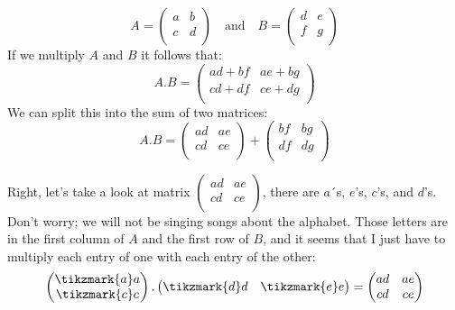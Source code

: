 \documentclass[600paper, 11pt,twoside,openany]{kdp}
\begin{document}
\[A = 
\begin{pmatrix}
a & b \\
c & d\\
\end{pmatrix} \quad \textrm{and} \quad  B = 
\begin{pmatrix}
d & e \\
f & g\\
\end{pmatrix}
\]
\indent If we multiply $A$ and $B$ it follows that:
\[A.B = 
\begin{pmatrix}
ad + bf & ae + bg \\
cd + df & ce + dg \\
\end{pmatrix}
\]
\indent We can split this into the sum of two matrices:
\begin{equation} \label{eq:mm}
A.B = 
\begin{pmatrix}
ad  & ae  \\
cd  & ce  \\
\end{pmatrix}
+
\begin{pmatrix}
bf &  bg \\
df &  dg \\
\end{pmatrix}
\end{equation}

\indent Right, let's take a look at matrix $\begin{pmatrix}
ad  & ae  \\
cd  & ce  \\
\end{pmatrix}$, there are $a$´s, $e$'s, $c$'s, and $d$'s. Don’t worry; we will not be singing songs about the alphabet. Those letters are in the first column of $A$ and the first row of $B$, and it seems that I just have to multiply each entry of one with each entry of the other:
\[\begin{pmatrix}
 \tikzmark{a}a\\
 \tikzmark{c}c\\
\end{pmatrix}.
\begin{pmatrix}
 \tikzmark{d}d &  \tikzmark{e}e \\
\end{pmatrix} = \begin{pmatrix}
ad  & ae  \\
cd  & ce  \\
\end{pmatrix}
\]
\end{document}
